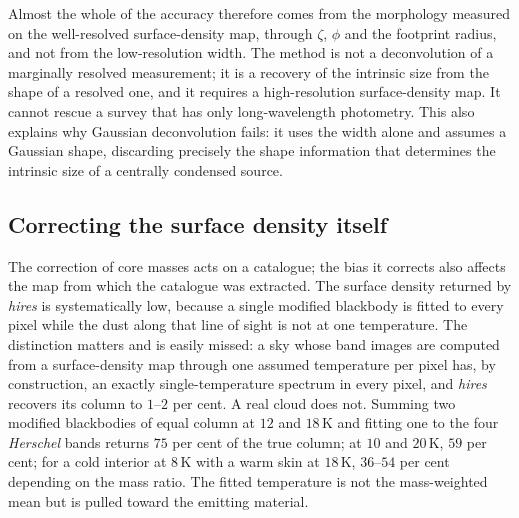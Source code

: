 \documentclass[11pt,a4paper]{article}
\begin{document}
Almost the whole of the accuracy therefore comes from the morphology measured
on the well-resolved surface-density map, through $\zeta$, $\phi$ and the
footprint radius, and not from the low-resolution width. The method is not a
deconvolution of a marginally resolved measurement; it is a recovery of the
intrinsic size from the shape of a resolved one, and it requires a
high-resolution surface-density map. It cannot rescue a survey that has only
long-wavelength photometry. This also explains why Gaussian deconvolution
fails: it uses the width alone and assumes a Gaussian shape, discarding
precisely the shape information that determines the intrinsic size of a
centrally condensed source.



\subsection{Correcting the surface density itself}
\label{sec:practice-hires}

The correction of core masses acts on a catalogue; the bias it corrects also
affects the map from which the catalogue was extracted. The surface density
returned by \emph{hires} is systematically low, because a single modified
blackbody is fitted to every pixel while the dust along that line of sight is
not at one temperature. The distinction matters and is easily missed: a sky
whose band images are computed from a surface-density map through one assumed
temperature per pixel has, by construction, an exactly single-temperature
spectrum in every pixel, and \emph{hires} recovers its column to $1$--$2$ per
cent. A real cloud does not. Summing two modified blackbodies of equal column
at $12$ and $18\,$K and fitting one to the four \emph{Herschel} bands returns
$75$ per cent of the true column; at $10$ and $20\,$K, $59$ per cent; for a
cold interior at $8\,$K with a warm skin at $18\,$K, $36$--$54$ per cent
depending on the mass ratio. The fitted temperature is not the mass-weighted
mean but is pulled toward the emitting material.
\end{document}
